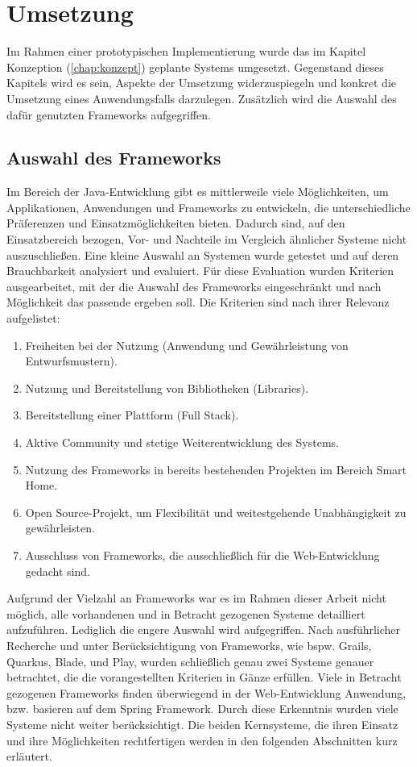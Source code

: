 \chapter{Umsetzung}
\label{chap:umsetzung}
    Im Rahmen einer prototypischen Implementierung wurde das im Kapitel Konzeption (\ref{chap:konzept}) geplante Systems 
    umgesetzt. Gegenstand dieses Kapitels wird es sein, Aspekte der Umsetzung widerzuspiegeln und konkret die Umsetzung eines  
    Anwendungsfalls darzulegen. Zusätzlich wird die Auswahl des dafür genutzten Frameworks aufgegriffen. 

\section{Auswahl des Frameworks}
\label{sec:frameworkauswahl}
    Im Bereich der Java-Entwicklung gibt es mittlerweile viele Möglichkeiten, um Applikationen, Anwendungen und Frameworks 
    zu entwickeln, die unterschiedliche Präferenzen und Einsatzmöglichkeiten bieten. Dadurch sind, auf den Einsatzbereich bezogen, 
    Vor- und Nachteile im Vergleich ähnlicher Systeme nicht auszuschließen. Eine kleine Auswahl an Systemen wurde getestet und auf deren 
    Brauchbarkeit analysiert und evaluiert. Für diese Evaluation wurden Kriterien ausgearbeitet, mit der die Auswahl des Frameworks 
    eingeschränkt und nach Möglichkeit das passende ergeben soll. Die Kriterien sind nach ihrer Relevanz aufgelistet: 
    \begin{enumerate}
        \item Freiheiten bei der Nutzung (Anwendung und Gewährleistung von Entwurfsmustern).
        \item Nutzung und Bereitstellung von Bibliotheken (Libraries).
        \item Bereitstellung einer Plattform (Full Stack).
        \item Aktive Community und stetige Weiterentwicklung des Systems.
        \item Nutzung des Frameworks in bereits bestehenden Projekten im Bereich Smart Home.
        \item Open Source-Projekt, um Flexibilität und weitestgehende Unabhängigkeit zu gewährleisten.
        \item Ausschluss von Frameworks, die ausschließlich für die Web-Entwicklung gedacht sind.
    \end{enumerate}  
    Aufgrund der Vielzahl an Frameworks war es im Rahmen dieser Arbeit nicht möglich, alle vorhandenen und in Betracht 
    gezogenen Systeme detailliert aufzuführen. Lediglich die engere Auswahl wird aufgegriffen. 
    Nach ausführlicher Recherche und unter Berücksichtigung von Frameworks, wie bspw. Grails, Quarkus, Blade, und Play, wurden 
    schließlich genau zwei Systeme genauer betrachtet, die die vorangestellten Kriterien in Gänze erfüllen. Viele in Betracht gezogenen Frameworks 
    finden überwiegend in der Web-Entwicklung Anwendung, bzw. basieren auf dem Spring Framework. Durch diese Erkenntnis wurden 
    viele Systeme nicht weiter berücksichtigt. Die beiden Kernsysteme, die ihren Einsatz und ihre Möglichkeiten rechtfertigen
    werden in den folgenden Abschnitten kurz erläutert.

